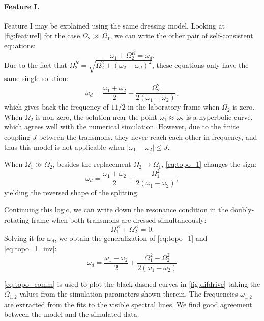 \documentclass[%
 prx,
 amsmath,amssymb,
 reprint,%
]{revtex4-1}
\begin{document}
\paragraph{Feature I.} Feature I may be explained using the same dressing model. Looking at \autoref{fig:featureI} for the case $\Omega_2 \gg \Omega_1$, we can write the other pair of self-consistent equations:
\begin{equation}
\omega_{1} \pm \Omega_2^R = \omega_d.
\end{equation}
Due to the fact that $\Omega_2^R = \sqrt{\Omega_2^2 + (\omega_2 - \omega_d)^2}$, these equations only have the same single solution:
\begin{equation}
\omega_d = \frac{\omega_1 + \omega_2}{2} - \frac{ \Omega_{2}^{2}}{2 \left(\omega_{1} - \omega_{2}\right)},
\label{eq:topo_1}
\end{equation}
which gives back the frequency of $11/2$ in the laboratory frame when $\Omega_2$ is zero. When $\Omega_2$ is non-zero, the solution near the point $\omega_1 \approx \omega_2$ is a hyperbolic curve, which agrees well with the numerical simulation. However, due to the finite coupling $J$ between the transmons, they never reach each other in frequency, and thus this model is not applicable when $|\omega_1 - \omega_2| \leq J$.

When $\Omega_1 \gg \Omega_2$, besides the replacement $\Omega_2 \rightarrow \Omega_1$, \autoref{eq:topo_1} changes the sign:
\begin{equation}
\omega_d = \frac{\omega_1 + \omega_2}{2} + \frac{ \Omega_{1}^{2}}{2 \left(\omega_{1} - \omega_{2}\right)},
\label{eq:topo_1_inv}
\end{equation}
yielding the reversed shape of the splitting.

Continuing this logic, we can write down the resonance condition in the doubly-rotating frame when both transmons are dressed simultaneously:
\begin{equation}
\Omega_1^R \pm \Omega_2^R = 0.
\label{eq:zero-photon}
\end{equation}
Solving it for $\omega_d$, we obtain the generalization of \autoref{eq:topo_1} and \autoref{eq:topo_1_inv}:
\begin{equation}
\omega_d = \frac{\omega_{1} - \omega_{2}}{2} + \frac{\Omega_{1}^{2} - \Omega_{2}^{2}}{ 2\left(\omega_{1} - \omega_{2}\right)}
\label{eq:topo_comm}
\end{equation}

\autoref{eq:topo_comm} is used to plot the black dashed curves in \autoref{fig:difdrive} taking the $\Omega_{1,2}$ values from the simulation parameters shown therein. The frequencies $\omega_{1,2}$ are extracted from the fits to the visible spectral lines. We find good agreement between the model and the simulated data.
\end{document}
